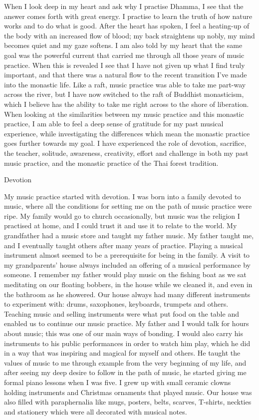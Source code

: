 When I look deep in my heart and ask why I practise Dhamma, I see that
the answer comes forth with great energy. I practise to learn the truth
of how nature works and to do what is good. After the heart has spoken,
I feel a heating-up of the body with an increased flow of blood; my back
straightens up nobly, my mind becomes quiet and my gaze softens. I am
also told by my heart that the same goal was the powerful current that
carried me through all those years of music practice. When this is
revealed I see that I have not given up what I find truly important, and
that there was a natural flow to the recent transition I've made into
the monastic life. Like a raft, music practice was able to take me
part-way across the river, but I have now switched to the raft of
Buddhist monasticism, which I believe has the ability to take me right
across to the shore of liberation. When looking at the similarities
between my music practice and this monastic practice, I am able to feel
a deep sense of gratitude for my past musical experience, while
investigating the differences which mean the monastic practice goes
further towards my goal. I have experienced the role of devotion,
sacrifice, the teacher, solitude, awareness, creativity, effort and
challenge in both my past music practice, and the monastic practice of
the Thai forest tradition.

Devotion

My music practice started with devotion. I was born into a family
devoted to music, where all the conditions for setting me on the path of
music practice were ripe. My family would go to church occasionally, but
music was the religion I practised at home, and I could trust it and use
it to relate to the world. My grandfather had a music store and taught
my father music. My father taught me, and I eventually taught others
after many years of practice. Playing a musical instrument almost seemed
to be a prerequisite for being in the family. A visit to my
grandparents' house always included an offering of a musical performance
by someone. I remember my father would play music on the fishing boat as
we sat meditating on our floating bobbers, in the house while we cleaned
it, and even in the bathroom as he showered. Our house always had many
different instruments to experiment with: drums, saxophones, keyboards,
trumpets and others. Teaching music and selling instruments were what
put food on the table and enabled us to continue our music practice. My
father and I would talk for hours about music; this was one of our main
ways of bonding. I would also carry his instruments to his public
performances in order to watch him play, which he did in a way that was
inspiring and magical for myself and others. He taught the values of
music to me through example from the very beginning of my life, and
after seeing my deep desire to follow in the path of music, he started
giving me formal piano lessons when I was five. I grew up with small
ceramic clowns holding instruments and Christmas ornaments that played
music. Our house was also filled with paraphernalia like mugs, posters,
belts, scarves, T-shirts, neckties and stationery which were all
decorated with musical notes.

